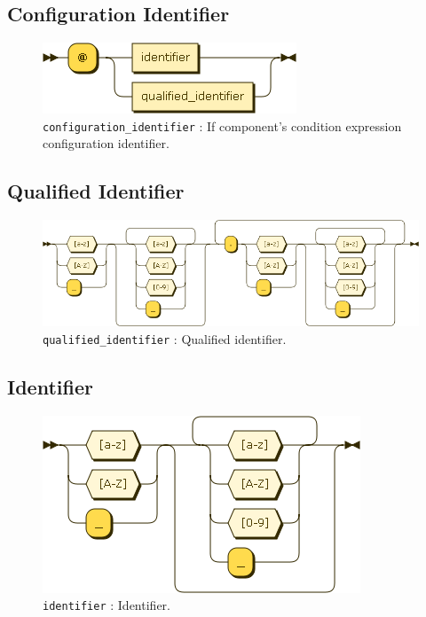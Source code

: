 \subsection{Configuration Identifier}
\begin{figure}[!h]
  \centering
    \includegraphics[scale=\DiagramScale]{chapters/compiler/diagrams/configuration_identifier}
  \caption{\texttt{configuration\_identifier} : If component's condition expression configuration identifier.}
  \label{fig:pcl-config-id}
\end{figure}

\subsection{Qualified Identifier}
\begin{figure}[!h]
  \centering
    \includegraphics[scale=\DiagramScale,angle=90]{chapters/compiler/diagrams/qualified_identifier}
  \caption{\texttt{qualified\_identifier} : Qualified identifier.}
  \label{fig:pcl-qualified-id}
\end{figure}

\subsection{Identifier}
\begin{figure}[!h]
  \centering
    \includegraphics[scale=\DiagramScale]{chapters/compiler/diagrams/identifier}
  \caption{\texttt{identifier} : Identifier.}
  \label{fig:pcl-id}
\end{figure}

